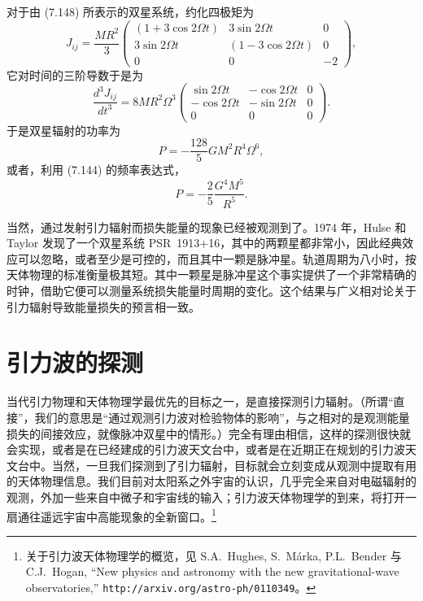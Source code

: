 对于由 (7.148) 所表示的双星系统，约化四极矩为
\begin{equation*}
J_{ij} = \frac{MR^2}{3}
\begin{pmatrix}
(1+3\cos 2\Omega t) & 3\sin 2\Omega t & 0\\
3\sin 2\Omega t & (1-3\cos 2\Omega t) & 0\\
0 & 0 & -2
\end{pmatrix},
\tag{7.190}
\end{equation*}
它对时间的三阶导数于是为
\begin{equation*}
\frac{d^3 J_{ij}}{dt^3} = 8MR^2\Omega^3
\begin{pmatrix}
\sin 2\Omega t & -\cos 2\Omega t & 0\\
-\cos 2\Omega t & -\sin 2\Omega t & 0\\
0 & 0 & 0
\end{pmatrix}.
\tag{7.191}
\end{equation*}
于是双星辐射的功率为
\begin{equation*}
P = -\frac{128}{5}GM^2R^4\Omega^6,
\tag{7.192}
\end{equation*}
或者，利用 (7.144) 的频率表达式，
\begin{equation*}
P = -\frac{2}{5}\frac{G^4M^5}{R^5}.
\tag{7.193}
\end{equation*}


当然，通过发射引力辐射而损失能量的现象已经被观测到了。1974 年，Hulse 和 Taylor 发现了一个双星系统 PSR~1913+16，其中的两颗星都非常小，因此经典效应可以忽略，或者至少是可控的，而且其中一颗是脉冲星。轨道周期为八小时，按天体物理的标准衡量极其短。其中一颗星是脉冲星这个事实提供了一个非常精确的时钟，借助它便可以测量系统损失能量时周期的变化。这个结果与广义相对论关于引力辐射导致能量损失的预言相一致。

\section{引力波的探测}

当代引力物理和天体物理学最优先的目标之一，是直接探测引力辐射。（所谓“直接”，我们的意思是“通过观测引力波对检验物体的影响”，与之相对的是观测能量损失的间接效应，就像脉冲双星中的情形。）完全有理由相信，这样的探测很快就会实现，或者是在已经建成的引力波天文台中，或者是在近期正在规划的引力波天文台中。当然，一旦我们探测到了引力辐射，目标就会立刻变成从观测中提取有用的天体物理信息。我们目前对太阳系之外宇宙的认识，几乎完全来自对电磁辐射的观测，外加一些来自中微子和宇宙线的输入；引力波天体物理学的到来，将打开一扇通往遥远宇宙中高能现象的全新窗口。\footnote{关于引力波天体物理学的概览，见 S.A.~Hughes, S.~Márka, P.L.~Bender 与 C.J.~Hogan, “New physics and astronomy with the new gravitational-wave observatories,” \texttt{http://arxiv.org/astro-ph/0110349}。}

